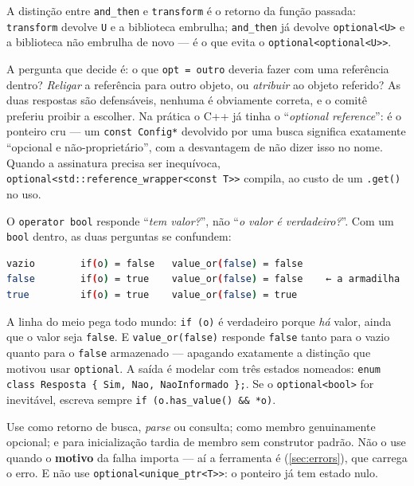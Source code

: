 A distinção entre \texttt{and\_then} e \texttt{transform} é o retorno da função
passada: \texttt{transform} devolve \texttt{U} e a biblioteca embrulha;
\texttt{and\_then} já devolve \texttt{optional<U>} e a biblioteca não embrulha
de novo --- é o que evita o \texttt{optional<optional<U>>}.

\begin{porque}
A pergunta que decide é: o que \texttt{opt = outro} deveria fazer com uma
referência dentro? \emph{Religar} a referência para outro objeto, ou
\emph{atribuir} ao objeto referido? As duas respostas são defensáveis, nenhuma é
obviamente correta, e o comitê preferiu proibir a escolher. Na prática o C++ já
tinha o ``\emph{optional reference}'': é o ponteiro cru --- um
\texttt{const Config*} devolvido por uma busca significa exatamente ``opcional e
não-proprietário'', com a desvantagem de não dizer isso no nome. Quando a
assinatura precisa ser inequívoca,
\texttt{optional<std::reference\_wrapper<const T>>} compila, ao custo de um
\texttt{.get()} no uso.
\end{porque}

\begin{armadilha}
O \texttt{operator bool} responde ``\emph{tem valor?}'', não ``\emph{o valor é
verdadeiro?}''. Com um \texttt{bool} dentro, as duas perguntas se confundem:
\begin{lstlisting}[style=bt, language=bash, frame=none,
                   xleftmargin=0pt, xrightmargin=0pt]
vazio        if(o) = false   value_or(false) = false
false        if(o) = true    value_or(false) = false    ← a armadilha
true         if(o) = true    value_or(false) = true
\end{lstlisting}
A linha do meio pega todo mundo: \texttt{if (o)} é verdadeiro porque \emph{há}
valor, ainda que o valor seja \texttt{false}. E \texttt{value\_or(false)}
responde \texttt{false} tanto para o vazio quanto para o \texttt{false}
armazenado --- apagando exatamente a distinção que motivou usar
\texttt{optional}. A saída é modelar com três estados nomeados:
\texttt{enum class Resposta \{ Sim, Nao, NaoInformado \};}. Se o
\texttt{optional<bool>} for inevitável, escreva sempre
\texttt{if (o.has\_value() \&\& *o)}.
\end{armadilha}

\begin{regra}
Use como retorno de busca, \emph{parse} ou consulta; como membro genuinamente
opcional; e para inicialização tardia de membro sem construtor padrão. Não o use
quando o \textbf{motivo} da falha importa --- aí a ferramenta é
 (\cref{sec:errors}), que carrega o erro. E não use
\texttt{optional<unique\_ptr<T>>}: o ponteiro já tem estado nulo.
\end{regra}

